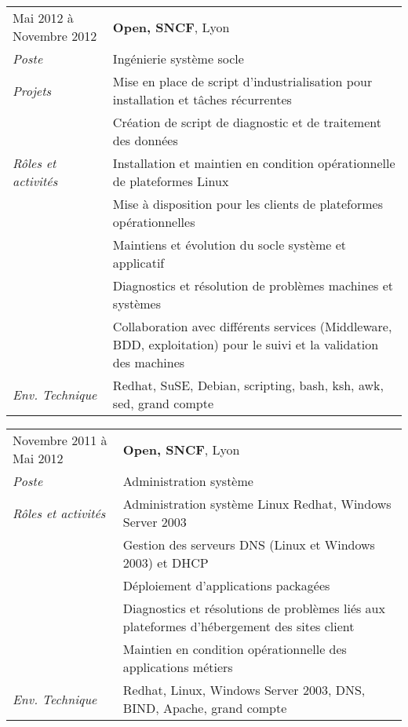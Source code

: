\documentclass[a4paper,8pt]{article}
\begin{document}
\begin{tabular}{P{3.5cm}|p{13cm}}
Mai 2012 à Novembre 2012	& \textbf{Open, SNCF}, Lyon\\
\textsl{Poste}				& Ingénierie système socle\\
\textsl{Projets}			& Mise en place de script d'industrialisation pour installation et tâches récurrentes\\
							& Création de script de diagnostic et de traitement des données\\
\textsl{Rôles et activités}	& Installation et maintien en condition opérationnelle de plateformes Linux\\
							& Mise à disposition pour les clients de plateformes opérationnelles\\
							& Maintiens et évolution du socle système et applicatif\\
							& Diagnostics et résolution de problèmes machines et systèmes\\
							& Collaboration avec différents services (Middleware, BDD, exploitation) pour le suivi et la validation des machines\\
\textsl{Env. Technique}		& Redhat, SuSE, Debian, scripting, bash, ksh, awk, sed, grand compte\\
\end{tabular}
\begin{tabular}{P{3.5cm}|p{13cm}}
Novembre 2011 à Mai 2012	& \textbf{Open, SNCF}, Lyon\\
\textsl{Poste}				& Administration système\\
\textsl{Rôles et activités} & Administration système Linux Redhat, Windows Server 2003\\
							& Gestion des serveurs DNS (Linux et Windows 2003) et DHCP\\
							& Déploiement d'applications packagées\\
							& Diagnostics et résolutions de problèmes liés aux plateformes d'hébergement des sites client\\
							& Maintien en condition opérationnelle des applications métiers\\
\textsl{Env. Technique}		& Redhat, Linux, Windows Server 2003, DNS, BIND, Apache, grand compte\\
\end{tabular}
\end{document}

